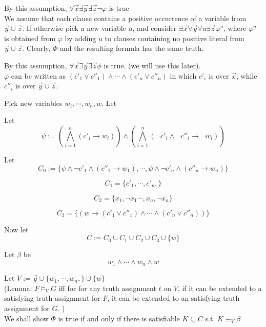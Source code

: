 \documentclass[12pt]{article}
\begin{document}
By this assumption, $\forall\vec{x}\exists\vec{y}\exists\vec{z}\neg \varphi$ is true\\

We assume that each clause contains a positive occurrence of a variable from $\vec{y}\cup\vec{z}$. If otherwise pick a new variable $u$, and consider $\exists \vec{x}\forall\vec{y}\forall u\exists \vec{z}\varphi^u$, where $\varphi^u$ is obtained from $\varphi$ by adding $u$ to clauses containing no positive literal from $\vec{y}\cup\vec{z}$. Clearly, $\Phi$ and the resulting formula has the same truth.

By this assumption, $\forall\vec{x}\exists\vec{y}\exists\vec{z}\phi$ is true. (we will use this later).\\ 

$\varphi$ can be written as $(c'_1\vee c''_1)\wedge\cdots\wedge (c'_n\vee c''_n)$ in which $c'_i$ is over $\vec{x}$, while $c''_i$ is over $\vec{y}\cup\vec{z}$.

Pick new variables $w_1, \cdots, w_n,w$. Let 

Let $$\psi:= \left(\bigwedge_{i=1}^n (c'_i\rightarrow w_i)\right)\wedge 
\left(\bigwedge_{i=1}^n(\neg c'_i\wedge \neg c''_i\rightarrow \neg w_i)\right)$$

Let $$C_0:=\{\psi\wedge \neg c'_1\wedge  (c''_1\rightarrow w_1) , \cdots, \psi\wedge\neg c'_n\wedge (c''_n\rightarrow w_n)\}$$

$$C_1=\{c'_1, \cdots, c'_n, \}$$

$$C_2=\{x_1,\neg x_1\cdots, x_n,\neg x_n\}$$

$$C_3=\{(w\rightarrow (c'_1\vee c''_1)\wedge\cdots\wedge (c'_n\vee c''_n))\}$$

Now let $$C:=C_0\cup C_1\cup C_2\cup C_3\cup\{w\}$$

Let $\beta$ be $$ w_1\wedge\cdots\wedge w_n\wedge w$$

Let $V:=\vec{y}\cup\{w_1,\cdots,w_n,\}\cup\{w\}$\\




(Lemma: $F\models_V G$ iff for for any truth assignment $t$ on $V$, if it can be extended to a satisfying truth assignment for $F$, it can be extended to an satisfying truth assignment for $G$. 
) \\

We shall show $\Phi$ is true if and only if there is satisfiable $K\subseteq C$ s.t. $K\equiv_V \beta$\\
\end{document}
